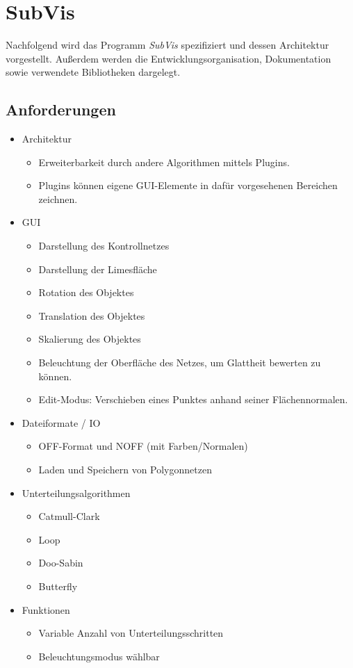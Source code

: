 \chapter{SubVis}

Nachfolgend wird das Programm \emph{SubVis} spezifiziert und dessen Architektur vorgestellt.
Außerdem werden die Entwicklungsorganisation, Dokumentation sowie verwendete Bibliotheken dargelegt.

\section{Anforderungen}

\begin{itemize}
 \item Architektur
 \begin{itemize}
 	\item Erweiterbarkeit durch andere Algorithmen mittels Plugins.
 	\item Plugins können eigene GUI-Elemente in dafür vorgesehenen Bereichen zeichnen.
 \end{itemize}
 \item GUI
  \begin{itemize}
 	\item Darstellung des Kontrollnetzes
 	\item Darstellung der Limesfläche
 	\item Rotation des Objektes
 	\item Translation des Objektes
 	\item Skalierung des Objektes
 	\item Beleuchtung der Oberfläche des Netzes, um Glattheit bewerten zu können.
 	\item Edit-Modus: Verschieben eines Punktes anhand seiner Flächennormalen.

 \end{itemize}
 \item Dateiformate / IO
 \begin{itemize}
 	\item OFF-Format und NOFF (mit Farben/Normalen)
 	\item Laden und Speichern von Polygonnetzen
 \end{itemize}
 \item Unterteilungsalgorithmen
 \begin{itemize}
 	\item Catmull-Clark
 	\item Loop
 	\item Doo-Sabin
 	\item Butterfly
 \end{itemize}
 \item Funktionen
 \begin{itemize}
  \item Variable Anzahl von Unterteilungsschritten
  \item Beleuchtungsmodus wählbar
 \end{itemize}
\end{itemize}

